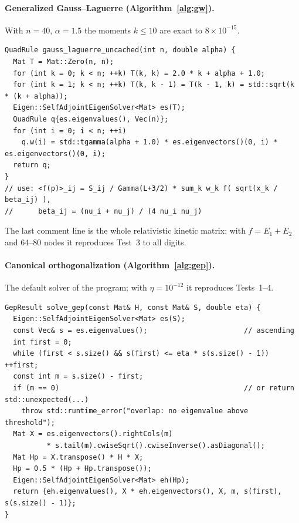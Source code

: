 \documentclass[11pt,a4paper]{article}
\numberwithin{equation}{section}
\theoremstyle{definition}
\theoremstyle{plain}
\theoremstyle{remark}
\numberwithin{algorithm}{section}
\begin{document}
\paragraph{Generalized Gauss--Laguerre (Algorithm~\ref{alg:gw}).} With $n=40$, $\alpha=1.5$ the moments $k\le10$ are exact to $8\times10^{-15}$.
\begin{lstlisting}[style=cpp]
QuadRule gauss_laguerre_uncached(int n, double alpha) {
  Mat T = Mat::Zero(n, n);
  for (int k = 0; k < n; ++k) T(k, k) = 2.0 * k + alpha + 1.0;
  for (int k = 1; k < n; ++k) T(k, k - 1) = T(k - 1, k) = std::sqrt(k * (k + alpha));
  Eigen::SelfAdjointEigenSolver<Mat> es(T);
  QuadRule q{es.eigenvalues(), Vec(n)};
  for (int i = 0; i < n; ++i)
    q.w(i) = std::tgamma(alpha + 1.0) * es.eigenvectors()(0, i) * es.eigenvectors()(0, i);
  return q;
}
// use: <f(p)>_ij = S_ij / Gamma(L+3/2) * sum_k w_k f( sqrt(x_k / beta_ij) ),
//      beta_ij = (nu_i + nu_j) / (4 nu_i nu_j)
\end{lstlisting}
The last comment line is the whole relativistic kinetic matrix: with $f=E_1+E_2$ and 64--80 nodes it reproduces Test~3 to all digits.

\paragraph{Canonical orthogonalization (Algorithm~\ref{alg:gep}).} The default solver of the program; with $\eta=10^{-12}$ it reproduces Tests~1--4.
\begin{lstlisting}[style=cpp]
GepResult solve_gep(const Mat& H, const Mat& S, double eta) {
  Eigen::SelfAdjointEigenSolver<Mat> es(S);
  const Vec& s = es.eigenvalues();                       // ascending
  int first = 0;
  while (first < s.size() && s(first) <= eta * s(s.size() - 1)) ++first;
  const int m = s.size() - first;
  if (m == 0)                                            // or return std::unexpected(...)
    throw std::runtime_error("overlap: no eigenvalue above threshold");
  Mat X = es.eigenvectors().rightCols(m)
          * s.tail(m).cwiseSqrt().cwiseInverse().asDiagonal();
  Mat Hp = X.transpose() * H * X;
  Hp = 0.5 * (Hp + Hp.transpose());
  Eigen::SelfAdjointEigenSolver<Mat> eh(Hp);
  return {eh.eigenvalues(), X * eh.eigenvectors(), X, m, s(first), s(s.size() - 1)};
}
\end{lstlisting}
\end{document}
